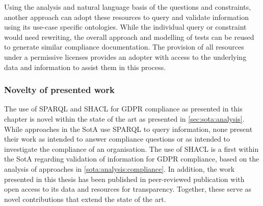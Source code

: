 Using the analysis and natural language basis of the questions and constraints, another approach can adopt these resources to query and validate information using its use-case specific ontologies.
While the individual query or constraint would need rewriting, the overall approach and modelling of tests can be reused to generate similar compliance documentation.
The provision of all resources under a permissive licenses provides an adopter with access to the underlying data and information to assist them in this process.

\subsubsection*{Novelty of presented work}
The use of SPARQL and SHACL for GDPR compliance as presented in this chapter is novel within the state of the art as presented in \autoref{sec:sota:analysis}.
While approaches in the SotA use SPARQL to query information, none present their work as intended to answer compliance questions or as intended to investigate the compliance of an organisation.
The use of SHACL is a first within the SotA regarding validation of information for GDPR compliance, based on the analysis of approaches in \autoref{sota:analysis:compliance}.
In addition, the work presented in this thesis has been published in peer-reviewed publication with open access to its data and resources for transparency.
Together, these serve as novel contributions that extend the state of the art.

